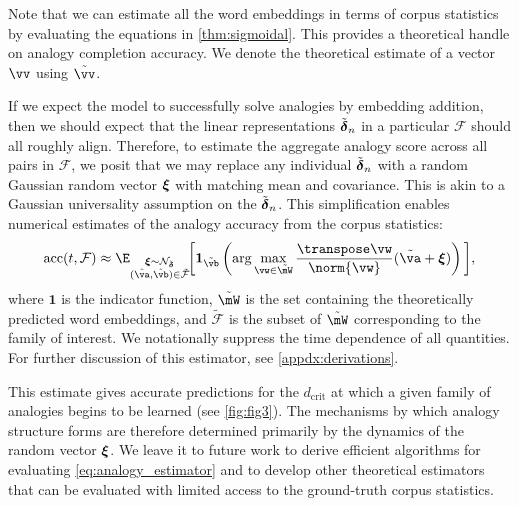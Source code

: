 Note that we can estimate all the word embeddings in terms of corpus statistics by evaluating the equations in \cref{thm:sigmoidal}. This provides a theoretical handle on analogy completion accuracy. We denote the theoretical estimate of a vector $\vv$ using $\tilde\vv$.

If we expect the model to successfully solve analogies by embedding addition, then we should expect that the linear representations $\tilde{\boldsymbol{\delta}}_n$ in a particular $\mathcal{F}$ should all roughly align. Therefore, to estimate the aggregate analogy score across all pairs in $\mathcal{F}$, we posit that we may replace any individual $\tilde{\boldsymbol{\delta}}_n$ with a random Gaussian random vector $\boldsymbol{\xi}$ with matching mean and covariance. This is akin to a Gaussian universality assumption on the $\tilde{\boldsymbol{\delta}}_n$. 
This simplification enables numerical estimates of the analogy accuracy from the corpus statistics:
\begin{equation}
    \mathrm{acc}(t, \mathcal{F}) \approx \E_{\substack{\vxi\sim\mathcal{N}_{\tilde\vdelta}\\ (\tilde\va,\tilde\vb)\in\mathcal{\tilde F}}} \! \bigg[ \mathbf{1}_{\tilde\vb}\left(\arg\max_{\vw\in\tilde\mW} \frac{\T\vw}{\norm{\vw}}(\tilde\va+\vxi) \right) \bigg],
    \label{eq:analogy_estimator}
\end{equation}
where $\mathbf{1}$ is the indicator function, $\tilde\mW$ is the set containing the theoretically predicted word embeddings, and $\mathcal{\tilde F}$ is the subset of $\tilde\mW$ corresponding to the family of interest. We notationally suppress the time dependence of all quantities. For further discussion of this estimator, see \cref{appdx:derivations}.

This estimate gives accurate predictions for the $d_\mathrm{crit}$ at which a given family of analogies begins to be learned (see \cref{fig:fig3}). The mechanisms by which analogy structure forms are therefore determined primarily by the dynamics of the random vector $\boldsymbol{\xi}$. We leave it to future work to derive efficient algorithms for evaluating \cref{eq:analogy_estimator} and to develop other theoretical estimators that can be evaluated with limited access to the ground-truth corpus statistics.